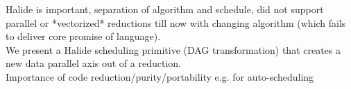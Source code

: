 Halide is important, separation of algorithm and schedule, did not
support parallel or *vectorized* reductions till now with changing
algorithm (which fails to deliver core promise of language).\\

We present a Halide scheduling primitive (DAG transformation) that
creates a new data parallel axis out of a reduction.\\

Importance of code reduction/purity/portability e.g. for
auto-scheduling